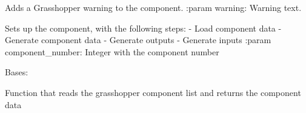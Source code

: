 \documentclass[letterpaper,10pt,english]{sphinxmanual}
\begin{document}
\begin{fulllineitems}
\begin{fulllineitems}
\end{fulllineitems}


\begin{fulllineitems}
\label{\detokenize{superclass:livestock.components.component.GHComponent.add_warning}}
Adds a Grasshopper warning to the component.
:param warning: Warning text.

\end{fulllineitems}


\begin{fulllineitems}
\label{\detokenize{superclass:livestock.components.component.GHComponent.config_component}}
Sets up the component, with the following steps:
- Load component data
- Generate component data
- Generate outputs
- Generate inputs
:param component\_number: Integer with the component number

\end{fulllineitems}


\end{fulllineitems}


\begin{fulllineitems}
\label{\detokenize{superclass:livestock.components.component.GroundTemperature}}
Bases: {\hyperref[\detokenize{superclass:livestock.components.component.GHComponent}]{}}

\end{fulllineitems}


\begin{fulllineitems}
\label{\detokenize{superclass:livestock.components.component.component_data}}
Function that reads the grasshopper component list and returns the component data

\end{fulllineitems}
\end{document}
